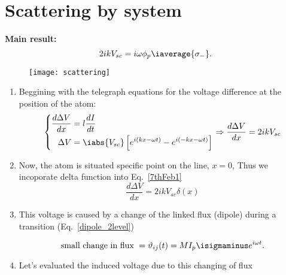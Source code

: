\section{Scattering by system \cite{Astafiev2010}}
\begin{framed}\noindent
  \textbf{Main result:}
  \begin{equation}\label{key}
    2ikV_{sc} = i\omega \phi_p\iaverage{\sigma_{-}}.
  \end{equation}
\end{framed}

\begin{figure}[h]
  \centering \texttt{[image: scattering]}
\end{figure}

\noindent

\begin{enumerate}
\item  Beggining   with  the  telegraph  equations   for  the  voltage
  difference at the position of the atom:
  \begin{equation}\label{7thFeb1}
    \left\lbrace\begin{aligned}
        \frac{d\Delta V}{dx} & = l\frac{dI}{dt}\\
        \Delta V & = \iabs{V_{sc}}\left[e^{i(kx - \omega t)} - e^{i(-kx - \omega t)}\right]
      \end{aligned}\right. \Rightarrow \frac{d\Delta V}{dx} = 2ikV_{sc}
  \end{equation}

\item Now, the atom is situated specific point on the line, $ x = 0 $,
  Thus we incoporate delta function into Eq.~\eqref{7thFeb1}
  \begin{equation}\label{7thFeb4}
    \frac{d\Delta V}{dx} = 2ikV_{sc}\delta(x)
  \end{equation}

\item This voltage  is caused by a change of  the linked flux (dipole)
  during a transition (Eq.~\eqref{dipole_2level})

  \begin{equation}\label{key}
    \text{small change in flux } = \vartheta_{ij}(t) = MI_p\isigmaminus e^{i\omega t}.
  \end{equation}

\item Let's evaluated the induced voltage due to this changing of flux


\end{enumerate}
